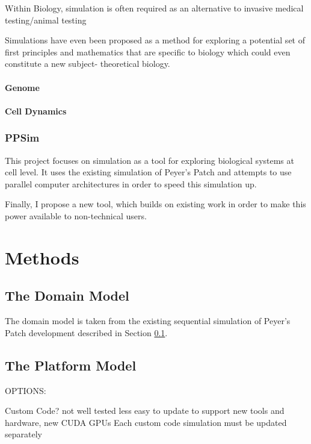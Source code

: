 \documentclass{UoYCSproject}
\begin{document}
Within Biology, simulation is often required as an alternative to invasive medical testing/animal testing


Simulations have even been proposed as a method for exploring a potential set of first principles and mathematics that are specific to biology which could even constitute a new subject- theoretical biology\cite{rise_article}.

\subsubsection{Genome}


\subsubsection{Cell Dynamics}


\subsection{PPSim}
\label{ppsim}
This project focuses on simulation as a tool for exploring biological systems at cell level. It uses the existing simulation of Peyer's Patch\cite{kieran_thesis} and attempts to use parallel computer architectures in order to speed this simulation up. %

Finally, I propose a new tool, which builds on existing work in order to make this power available to non-technical users.

\chapter{Methods}
\label{methods}
\section{The Domain Model}
The domain model is taken from the existing sequential simulation of Peyer's Patch development described in Section \ref{ppsim}.

\section{The Platform Model}
OPTIONS:

Custom Code?\cite{phil_diss}
	not well tested
	less easy to update to support new tools and hardware, new CUDA GPUs
		Each custom code simulation must be updated separately
\end{document}
